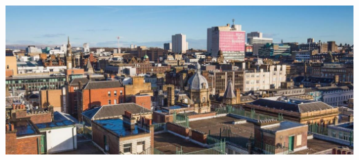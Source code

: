 \documentclass{article}
\begin{document}
\vskip 4cm
\begin{center}
\includegraphics[width=1\textwidth]{glasgow_new}
\end{center}
\end{document}

